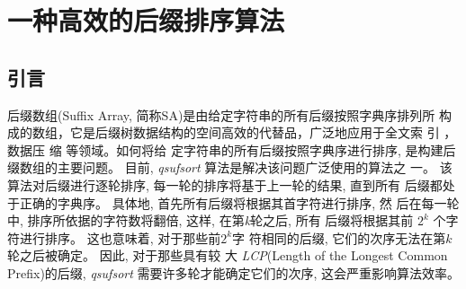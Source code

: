 

\chapter{一种高效的后缀排序算法}
\section{引言}
\label{sec:introduction}

后缀数组(Suffix Array, 简称SA)是由给定字符串的所有后缀按照字典序排列所
构成的数组，它是后缀树数据结构的空间高效的代替品，广泛地应用于全文索
引 \cite{Strate2015,Fischer2017,Arroyuelo2014}，数据压
缩\cite{Louza2015,Chien2015,Pradhan2016,Brisaboa2015} 等领域。如何将给
定字符串的所有后缀按照字典序进行排序, 是构建后缀数组的主要问题。 目前,
\emph{qsufsort}\cite{Larsson2007} 算法是解决该问题广泛使用的算法之
一。 该算法对后缀进行逐轮排序, 每一轮的排序将基于上一轮的结果, 直到所有
后缀都处于正确的字典序。 具体地, 首先所有后缀将根据其首字符进行排序, 然
后在每一轮中, 排序所依据的字符数将翻倍, 这样, 在第\emph{k}轮之后, 所有
后缀将根据其前 $2^{k}$ 个字符进行排序。 这也意味着, 对于那些前$2^{k}$字
符相同的后缀, 它们的次序无法在第$k$轮之后被确定。 因此, 对于那些具有较
大 \emph{LCP}(Length of the Longest Common Prefix)的后缀,
\emph{qsufsort} 需要许多轮才能确定它们的次序, 这会严重影响算法效率。

